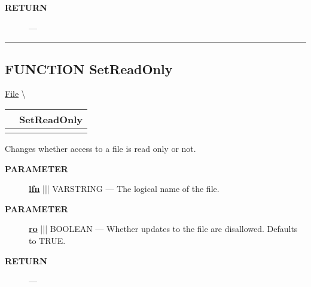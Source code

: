 \par
\begin{description}
\item [\colorbox{tagtype}{\color{white} \textbf{\textsf{RETURN}}}] \textbf{} --- 
\end{description}




\rule{\linewidth}{0.5pt}
\subsection*{\textsf{\colorbox{headtoc}{\color{white} FUNCTION}
SetReadOnly}}

\hypertarget{ecldoc:file.setreadonly}{}
\hspace{0pt} \hyperlink{ecldoc:File}{File} \textbackslash 

{\renewcommand{\arraystretch}{1.5}
\begin{tabularx}{\textwidth}{|>{\raggedright\arraybackslash}l|X|}
\hline
\hspace{0pt}\mytexttt{\color{red} } & \textbf{SetReadOnly} \\
\hline
\multicolumn{2}{|>{\raggedright\arraybackslash}X|}{\hspace{0pt}\mytexttt{\color{param} (varstring lfn, boolean ro=TRUE)}} \\
\hline
\end{tabularx}
}

\par





Changes whether access to a file is read only or not.






\par
\begin{description}
\item [\colorbox{tagtype}{\color{white} \textbf{\textsf{PARAMETER}}}] \textbf{\underline{lfn}} ||| VARSTRING --- The logical name of the file.
\item [\colorbox{tagtype}{\color{white} \textbf{\textsf{PARAMETER}}}] \textbf{\underline{ro}} ||| BOOLEAN --- Whether updates to the file are disallowed. Defaults to TRUE.
\end{description}







\par
\begin{description}
\item [\colorbox{tagtype}{\color{white} \textbf{\textsf{RETURN}}}] \textbf{} --- 
\end{description}




